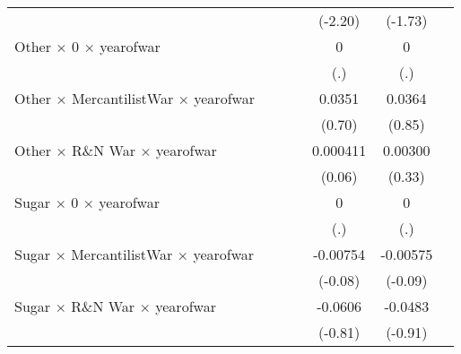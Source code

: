 {\begin{tabular}{l*{6}{c}}
                    &                     &                     &                     &     (-2.20)         &     (-1.73)         &                     \\
[1em]
Other $\times$ 0 $\times$ yearofwar&                     &                     &                     &           0         &           0         &                     \\
                    &                     &                     &                     &         (.)         &         (.)         &                     \\
[1em]
Other $\times$ MercantilistWar $\times$ yearofwar&                     &                     &                     &      0.0351         &      0.0364         &                     \\
                    &                     &                     &                     &      (0.70)         &      (0.85)         &                     \\
[1em]
Other $\times$ R\&N War $\times$ yearofwar&                     &                     &                     &    0.000411         &     0.00300         &                     \\
                    &                     &                     &                     &      (0.06)         &      (0.33)         &                     \\
[1em]
Sugar $\times$ 0 $\times$ yearofwar&                     &                     &                     &           0         &           0         &                     \\
                    &                     &                     &                     &         (.)         &         (.)         &                     \\
[1em]
Sugar $\times$ MercantilistWar $\times$ yearofwar&                     &                     &                     &    -0.00754         &    -0.00575         &                     \\
                    &                     &                     &                     &     (-0.08)         &     (-0.09)         &                     \\
[1em]
Sugar $\times$ R\&N War $\times$ yearofwar&                     &                     &                     &     -0.0606         &     -0.0483         &                     \\
                    &                     &                     &                     &     (-0.81)         &     (-0.91)         &                     \\

\end{tabular}}
